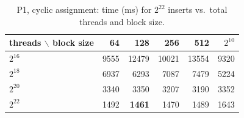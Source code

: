 \begin{table}[H]\centering\small
\caption{P1, cyclic assignment: time (ms) for $2^{22}$ inserts vs.\ total threads and block size.}\label{tab:p1cyclic}
\begin{tabular}{lrrrrr}
\toprule
threads $\backslash$ block size & 64 & 128 & 256 & 512 & $2^{10}$ \\
\midrule
$2^{16}$ & 9555 & 12479 & 10021 & 13554 & 9320 \\
$2^{18}$ & 6937 & 6293 & 7087 & 7479 & 5224 \\
$2^{20}$ & 3340 & 3350 & 3207 & 3190 & 3352 \\
$2^{22}$ & 1492 & \textbf{1461} & 1470 & 1489 & 1643 \\
\bottomrule
\end{tabular}
\end{table}
